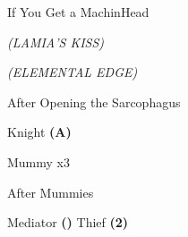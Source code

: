 \begin{paracol}{2}
\switchcolumn
\vspace{-2cm}
\begin{misc}{If You Get a MachinHead}
    \begin{notes}
        \item {}
    \end{notes}
    \begin{round}{1}
        \bartz \rightCommand{\combine} \then \battleGroup{\maidensKiss \space + \eyedrop} \textit{(LAMIA'S KISS)} \then {}
        \cara \leftCommand{\throw} \then \thunderScroll 
        \faris \leftCommand{\throw} \then \thunderScroll 
    \end{round}
    \begin{round}{2}
        \bartz \rightCommand{\combine} \then \battleGroup{\eyedrop \space + \revivify} \textit{(ELEMENTAL EDGE)} \then {}
        \cara \leftCommand{\throw} \then \thunderScroll 
        \faris \leftCommand{\throw} \then \thunderScroll 
    \end{round}
\end{misc}

\switchcolumn
\begin{menu}{After Opening the Sarcophagus}
    \varwb
    \begin{jobMenu}
        \bartz Knight \textbf{(A)} \ability{!\black} \optimize
    \end{jobMenu}
    \begin{itemMenu}
        \hiPotionMenu {}
    \end{itemMenu}
    \varwe
\end{menu}

\begin{boss}{Mummy x3}
    \varwb
    \begin{round}{1}
        \cara \leftCommand{\throw} \then \flameScroll
        \faris \leftCommand{\throw} \then \flameScroll
        \bartz \rightCommand{\black} \then \fire
    \end{round}
    \varwe
\end{boss}

\begin{menu}{After Mummies}
    \varwb
    \begin{jobMenu}
        \faris Mediator \textbf{(\pointUp)}
        \cara Thief \textbf{(2\pointRight)} \ability{!\escape}
    \end{jobMenu}
    \varwe
\end{menu}


\end{paracol}

